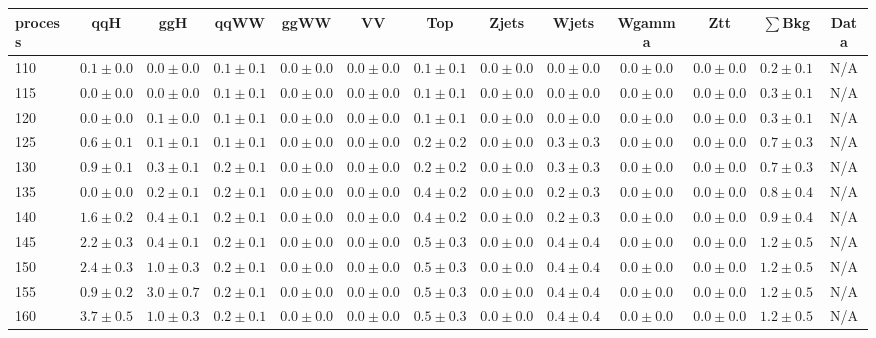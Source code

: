 \begin{table}
{%
 \tiny
 \begin{center}
 \begin{tabular}{l | c c | c c c c c c c c  | c c}
 \hline
 process & qqH & ggH & qqWW & ggWW & VV & Top & Zjets & Wjets & Wgamma & Ztt & $\sum$Bkg & Data \\
 \hline
110 & $0.1\pm0.0$ & $0.0\pm0.0$ & $0.1\pm0.1$ & $0.0\pm0.0$ & $0.0\pm0.0$ & $0.1\pm0.1$ & $0.0\pm0.0$ & $0.0\pm0.0$ & $0.0\pm0.0$ & $0.0\pm0.0$ & $0.2\pm0.1$ & N/A \\
115 & $0.0\pm0.0$ & $0.0\pm0.0$ & $0.1\pm0.1$ & $0.0\pm0.0$ & $0.0\pm0.0$ & $0.1\pm0.1$ & $0.0\pm0.0$ & $0.0\pm0.0$ & $0.0\pm0.0$ & $0.0\pm0.0$ & $0.3\pm0.1$ & N/A \\
120 & $0.0\pm0.0$ & $0.1\pm0.0$ & $0.1\pm0.1$ & $0.0\pm0.0$ & $0.0\pm0.0$ & $0.1\pm0.1$ & $0.0\pm0.0$ & $0.0\pm0.0$ & $0.0\pm0.0$ & $0.0\pm0.0$ & $0.3\pm0.1$ & N/A \\
125 & $0.6\pm0.1$ & $0.1\pm0.1$ & $0.1\pm0.1$ & $0.0\pm0.0$ & $0.0\pm0.0$ & $0.2\pm0.2$ & $0.0\pm0.0$ & $0.3\pm0.3$ & $0.0\pm0.0$ & $0.0\pm0.0$ & $0.7\pm0.3$ & N/A \\
130 & $0.9\pm0.1$ & $0.3\pm0.1$ & $0.2\pm0.1$ & $0.0\pm0.0$ & $0.0\pm0.0$ & $0.2\pm0.2$ & $0.0\pm0.0$ & $0.3\pm0.3$ & $0.0\pm0.0$ & $0.0\pm0.0$ & $0.7\pm0.3$ & N/A \\
135 & $0.0\pm0.0$ & $0.2\pm0.1$ & $0.2\pm0.1$ & $0.0\pm0.0$ & $0.0\pm0.0$ & $0.4\pm0.2$ & $0.0\pm0.0$ & $0.2\pm0.3$ & $0.0\pm0.0$ & $0.0\pm0.0$ & $0.8\pm0.4$ & N/A \\
140 & $1.6\pm0.2$ & $0.4\pm0.1$ & $0.2\pm0.1$ & $0.0\pm0.0$ & $0.0\pm0.0$ & $0.4\pm0.2$ & $0.0\pm0.0$ & $0.2\pm0.3$ & $0.0\pm0.0$ & $0.0\pm0.0$ & $0.9\pm0.4$ & N/A \\
145 & $2.2\pm0.3$ & $0.4\pm0.1$ & $0.2\pm0.1$ & $0.0\pm0.0$ & $0.0\pm0.0$ & $0.5\pm0.3$ & $0.0\pm0.0$ & $0.4\pm0.4$ & $0.0\pm0.0$ & $0.0\pm0.0$ & $1.2\pm0.5$ & N/A \\
150 & $2.4\pm0.3$ & $1.0\pm0.3$ & $0.2\pm0.1$ & $0.0\pm0.0$ & $0.0\pm0.0$ & $0.5\pm0.3$ & $0.0\pm0.0$ & $0.4\pm0.4$ & $0.0\pm0.0$ & $0.0\pm0.0$ & $1.2\pm0.5$ & N/A \\
155 & $0.9\pm0.2$ & $3.0\pm0.7$ & $0.2\pm0.1$ & $0.0\pm0.0$ & $0.0\pm0.0$ & $0.5\pm0.3$ & $0.0\pm0.0$ & $0.4\pm0.4$ & $0.0\pm0.0$ & $0.0\pm0.0$ & $1.2\pm0.5$ & N/A \\
160 & $3.7\pm0.5$ & $1.0\pm0.3$ & $0.2\pm0.1$ & $0.0\pm0.0$ & $0.0\pm0.0$ & $0.5\pm0.3$ & $0.0\pm0.0$ & $0.4\pm0.4$ & $0.0\pm0.0$ & $0.0\pm0.0$ & $1.2\pm0.5$ & N/A \\

\end{tabular}
\end{center}}
\end{table}

